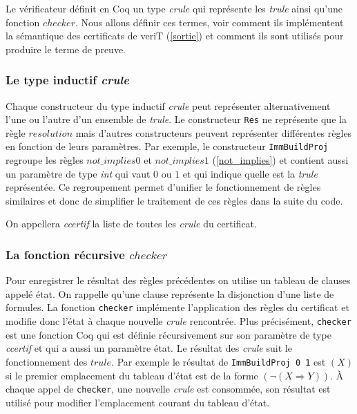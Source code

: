 \documentclass[11pt]{article}
\begin{document}
Le vérificateur définit en Coq un type \textit{crule} qui représente les \textit{trule} ainsi qu'une fonction $checker$. Nous allons définir ces termes, voir comment ils implémentent la sémantique des certificats de veriT (\ref{sortie}) et comment ils sont utilisés pour produire le terme de preuve.


\subsubsection{Le type inductif \textit{crule}}\label{regroupement}


Chaque constructeur du type inductif \textit{crule} peut représenter alternativement l'une ou l'autre d'un ensemble de \textit{trule}. Le constructeur \texttt{Res} ne représente que la règle $resolution$ mais d'autres constructeurs peuvent représenter différentes règles en fonction de leurs paramètres. Par exemple, le constructeur \texttt{ImmBuildProj} regroupe les règles $not\_implies0$ et $not\_implies1$ (\ref{not_implies}) et contient aussi un paramètre de type \textit{int} qui vaut $0$ ou $1$ et qui indique quelle est la \textit{trule} représentée. Ce regroupement permet d'unifier le fonctionnement de règles similaires et donc de simplifier le traitement de ces règles dans la suite du code. \medbreak

On appellera \textit{ccertif} la liste de toutes les \textit{crule} du certificat.


\subsubsection{La fonction récursive $checker$} \label{checker}

Pour enregistrer le résultat des règles précédentes on utilise un tableau de clauses appelé état. On rappelle qu'une clause représente la disjonction d'une liste de formules. La fonction \texttt{checker} implémente l'application des règles du certificat et modifie donc l'état à chaque nouvelle \textit{crule} rencontrée. Plus précisément, \texttt{checker} est une fonction Coq qui est définie récursivement sur son paramètre de type \textit{ccertif} et qui a aussi un paramètre état. Le résultat des \textit{crule} suit le fonctionnement des $trule$. Par exemple le résultat de \texttt{ImmBuildProj 0 1} est $(X)$ si le premier emplacement du tableau d'état est de la forme $(\neg (X \Rightarrow Y))$. À chaque appel de \texttt{checker}, une nouvelle \textit{crule} est consommée, son résultat est utilisé pour modifier l'emplacement courant du tableau d'état.\medbreak
\end{document}
